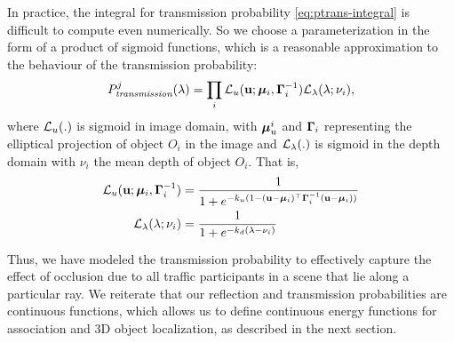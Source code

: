 In practice, the integral for transmission probability \eqref{eq:ptrans-integral} is difficult to compute even numerically. So we choose a parameterization in the form of a product of sigmoid functions, which is a reasonable approximation to the behaviour of the transmission probability:
%
\begin{align}
P^j_{\textit{transmission}}(\lambda) = \prod_i \mathcal{L}_u (\mathbf{u}; {\bm{\mu}}_i, \bm{\Gamma}_i^{-1}) \mathcal{L}_{\lambda}(\lambda; \nu_i),
\label{eq:evalCumulativePtrans}
\end{align}
%
where $\mathcal{L}_u(.)$ is sigmoid in image domain, with ${\bm{\mu}}^i_u$ and $\bm{\Gamma}_i$ representing the elliptical projection of object $O_i$ in the image and $\mathcal{L}_{\lambda}(.)$ is sigmoid in the depth domain with $\nu_i$ the mean depth of object $O_i$. That is,
%
\begin{align}
\mathcal{L}_u(\mathbf{u}; {\bm{\mu}}_i, \bm{\Gamma}_i^{-1}) &= \frac{1}{1 + e^{-k_u(1 - (\mathbf{u} - {\bm{\mu}}_i)^\top \bm{\Gamma}_i^{-1} (\mathbf{u} - {\bm{\mu}}_i))}} \\
\mathcal{L}_{\lambda}(\lambda; \nu_i) &= \frac{1}{1 + e^{-k_d(\lambda - \nu_i)}}
\end{align}
%

Thus, we have modeled the transmission probability to effectively capture the effect of occlusion due to all traffic participants in a scene that lie along a particular ray. We reiterate that our reflection and transmission probabilities are continuous functions, which allows us to define continuous energy functions for association and 3D object localization, as described in the next section.





